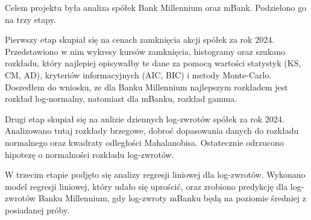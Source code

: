 \documentclass[12pt]{article}
\begin{document}
Celem projektu była analiza spółek Bank Millennium oraz mBank. Podzielono go na trzy etapy.
\par
Pierwszy etap skupiał się na cenach zamknięcia akcji spółek za rok 2024. Przedstawiono w nim wykresy kursów zamknięcia, histogramy oraz szukano rozkładu, który najlepiej opisywałby te dane za pomocą wartości statystyk (KS, CM, AD), kryteriów informacyjnych (AIC, BIC) i metody Monte-Carlo.
Doszedłem do wniosku, ze dla Banku Millennium najlepszym rozkładem jest rozkład log-normalny, natomiast dla mBanku, rozkład gamma.
\par
Drugi etap skupiał się na anlizie dziennych log-zwrotów spółek za rok 2024. Analizowano tutaj rozkłady brzegowe, dobroć dopasowania danych do rozkładu normalnego oraz kwadraty odległości Mahalanobisa. Ostatecznie odrzucono hipotezę o normalności rozkładu log-zwrotów.
\par
W trzecim etapie podjęto się analizy regresji liniowej dla log-zwrotów. Wykonano model regresji liniowej, który udało się uprościć, oraz zrobiono predykcję dla log-zwrotów Banku Millennium, gdy log-zwroty mBanku będą na poziomie średniej z posiadanej próby.
\end{document}
